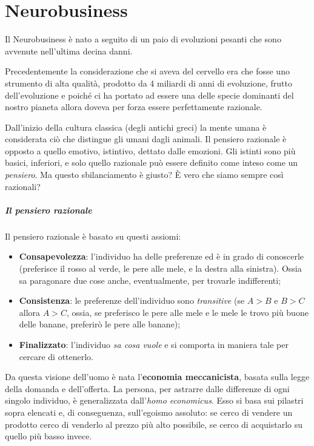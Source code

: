 \chapter{Neurobusiness}

Il Neurobusiness è nato a seguito di un paio di evoluzioni pesanti che sono
avvenute nell'ultima decina danni.

Precedentemente la considerazione che si aveva del cervello era che fosse uno
strumento di alta qualità, prodotto da 4 miliardi di anni di evoluzione, frutto
dell'evoluzione e poiché ci ha portato ad essere una delle specie dominanti del
nostro pianeta allora doveva per forza essere perfettamente razionale.

Dall'inizio della cultura classica (degli antichi greci) la mente umana è
considerata ciò che distingue gli umani dagli animali. Il pensiero razionale è
opposto a quello emotivo, istintivo, dettato dalle emozioni. Gli istinti sono
più basici, inferiori, e solo quello razionale può essere definito come inteso
come un \textit{pensiero}. Ma questo sbilanciamento è giusto? È vero che siamo
sempre così razionali?

\paragraph*{Il pensiero razionale} Il pensiero razionale è basato su questi
assiomi:
\begin{itemize}
 \item \textbf{Consapevolezza}: l'individuo ha delle preferenze ed è in grado
 di conoscerle (preferisce il rosso al verde, le pere alle mele, e la destra
 alla sinistra). Ossia sa paragonare due cose anche, eventualmente, per
 trovarle indifferenti;
 \item \textbf{Consistenza}: le preferenze dell'individuo sono \emph{transitive}
 (se $A > B$ e $B > C$ allora $A > C$, ossia, se preferisco le pere alle mele e
 le mele le trovo più buone delle banane, preferirò le pere alle banane);
 \item \textbf{Finalizzato}: l'individuo \emph{sa cosa vuole} e si comporta in
 maniera tale per cercare di ottenerlo.
\end{itemize}
Da questa visione dell'uomo è nata l'\textbf{economia meccanicista}, basata
sulla legge della domanda e dell'offerta. La persona, per astrarre dalle
differenze di ogni singolo individuo, è generalizzata dall'\textit{homo
economicus}. Esso si basa sui pilastri sopra elencati e, di conseguenza,
sull'egoismo assoluto: se cerco di vendere un prodotto cerco di venderlo al
prezzo più alto possibile, se cerco di acquistarlo su quello più basso invece.

